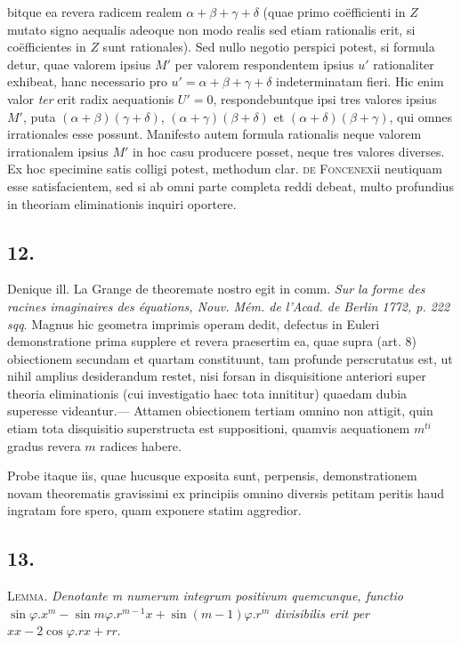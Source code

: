 \documentclass[14pt]{memoir}
\theoremstyle{plain}
\theoremstyle{remark}
\begin{document}
bitque ea revera radicem realem \( \alpha+\beta+\gamma+\delta \) (quae primo co\"efficienti in \(Z\) mutato signo aequalis adeoque non modo realis sed etiam rationalis erit, si co\"efficientes in \(Z\) sunt rationales). Sed nullo negotio perspici potest, si formula detur, quae valorem ipsius \(M'\) per valorem respondentem ipsius \(u'\) rationaliter exhibeat, hanc necessario pro \(u' = \alpha + \beta + \gamma + \delta \) indeterminatam fieri.  Hic enim valor \textit{ter} erit radix aequationis \(U' = 0\), respondebuntque ipsi tres valores ipsius \(M'\), puta \((\alpha+\beta)(\gamma+\delta)\), \((\alpha+\gamma)(\beta+\delta)\) et \((\alpha+\delta)(\beta+\gamma)\), qui omnes irrationales esse possunt. Manifesto autem formula rationalis neque valorem irrationalem ipsius \(M'\) in hoc casu producere posset, neque tres valores diverses. Ex hoc specimine satis colligi potest, methodum clar. \textsc{de Foncenex}ii neutiquam esse satisfacientem, sed si ab omni parte completa reddi debeat, multo profundius in theoriam eliminationis inquiri oportere.

\subsection*{12.}

Denique ill. La Grange de theoremate nostro egit in comm. \textit{Sur la forme des racines imaginaires des \'equations, Nouv. M\'em. de l'Acad. de Berlin 1772, p. 222 sqq}. Magnus hic geometra imprimis operam dedit, defectus in Euleri demonstratione prima supplere et revera praesertim ea, quae supra (art. 8) obiectionem secundam et quartam constituunt, tam profunde perscrutatus est, ut nihil amplius desiderandum restet, nisi forsan in disquisitione anteriori super theoria eliminationis (cui investigatio haec tota innititur) quaedam dubia superesse videantur.—  Attamen obiectionem tertiam omnino non attigit, quin etiam tota disquisitio superstructa est suppositioni, quamvis aequationem \(m^{ti}\) gradus revera \(m\) radices habere.

Probe itaque iis, quae hucusque exposita sunt, perpensis, demonstrationem novam theorematis gravissimi ex principiis omnino diversis petitam peritis haud ingratam fore spero, quam exponere statim aggredior.

\subsection*{13.}

\textsc{Lemma.} \textit{ Denotante m numerum integrum positivum quemcunque, functio \(\sin \varphi . x^m - \sin m \varphi . r^{m-1} x + \sin(m-1)\varphi . r^m\) divisibilis erit per \(xx - 2 \cos \varphi . rx + rr \)}.
\end{document}
